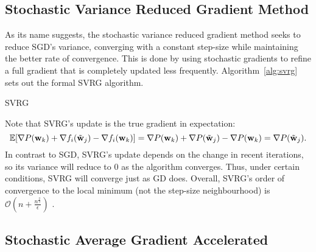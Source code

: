 \subsection{Stochastic Variance Reduced Gradient Method}

As its name suggests, the stochastic variance reduced gradient method seeks to reduce SGD's variance, converging with a constant step-size while maintaining the better rate of convergence. This is done by using stochastic gradients to refine a full gradient that is completely updated less frequently. Algorithm~\ref{alg:svrg} sets out the formal SVRG algorithm.

\begin{algorithm}[H] 
    \caption{SVRG \cite{johnson2013accelerating}}
    \label{alg:svrg}
\end{algorithm}

Note that SVRG's update is the true gradient in expectation:
\begin{equation}\label{stochastic gradient in SVRG}
    \mathbb{E}[\nabla P(\mathbf{w}_k) + \nabla f_i(\Tilde{\mathbf{w}}_j) - \nabla f_i(\mathbf{w}_k)] = \nabla P(\mathbf{w}_k) + \nabla P(\Tilde{\mathbf{w}}_j) - \nabla P(\mathbf{w}_k) = \nabla P(\Tilde{\mathbf{w}}_j).
\end{equation}
In contrast to SGD, SVRG's update depends on the change in recent iterations, so its variance will reduce to $0$ as the algorithm converges. Thus, under certain conditions, SVRG will converge just as GD does. Overall, SVRG's order of convergence to the local minimum (not the step-size neighbourhood) is $\mathcal{O}\left(n + \frac{n^{\frac{2}{3}}}{\epsilon}\right)$ \cite{reddi2016stochastic}.

\subsection{Stochastic Average Gradient Accelerated}

